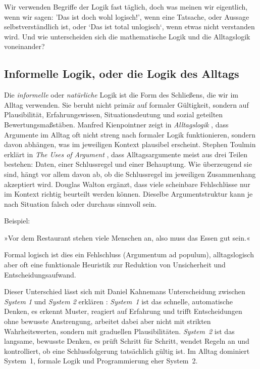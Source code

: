 \documentclass[parskip=half,a4paper,11pt]{scrreprt}
\begin{document}
Wir verwenden Begriffe der Logik fast täglich, doch was meinen wir eigentlich, wenn wir sagen:  ’Das ist doch wohl logisch!’, wenn eine Tatsache, oder Aussage selbstverständlich ist, oder ‘Das ist total unlogisch‘, wenn etwas nicht verstanden wird. Und wie unterscheiden sich die mathematische Logik und die Alltagslogik voneinander?

\subsection{Informelle Logik, oder die Logik des Alltags}

Die \textit{informelle} oder \textit{natürliche} Logik ist die Form des Schließens, die wir im Alltag verwenden. Sie beruht nicht primär auf formaler Gültigkeit, sondern auf Plausibilität, Erfahrungswissen, Situationsdeutung und sozial geteilten Bewertungsmaßstäben. Manfred Kienpointner zeigt in \textit{Alltagslogik} \citep{Kienpointner1992}, dass Argumente im Alltag oft nicht streng nach formaler Logik funktionieren, sondern davon abhängen, was im jeweiligen Kontext plausibel erscheint. Stephen Toulmin erklärt in \textit{The Uses of Argument} \citep{Toulmin1958}, dass Alltagsargumente meist aus drei Teilen bestehen: Daten, einer Schlussregel und einer Behauptung. Wie überzeugend sie sind, hängt vor allem davon ab, ob die Schlussregel im jeweiligen Zusammenhang akzeptiert wird. Douglas Walton \citep{Walton1998} ergänzt, dass viele scheinbare Fehlschlüsse nur im Kontext richtig beurteilt werden können. Dieselbe Argumentstruktur kann je nach Situation falsch oder durchaus sinnvoll sein. 

Beispiel: 
\begin{displayquote}
»Vor dem Restaurant stehen viele Menschen an, also muss das Essen gut sein.«
\end{displayquote}
Formal logisch ist dies ein Fehlschluss (Argumentum ad populum), alltagslogisch aber oft eine funktionale Heuristik zur Reduktion von Unsicherheit und Entscheidungsaufwand.

Dieser Unterschied lässt sich mit Daniel Kahnemans Unterscheidung zwischen \textit{System 1} und \textit{System 2} erklären \citep{Kahneman2011}: \textit{System~1} ist das schnelle, automatische Denken, es erkennt Muster, reagiert auf Erfahrung und trifft Entscheidungen ohne bewusste Anstrengung, arbeitet dabei aber nicht mit strikten Wahrheitswerten, sondern mit graduellen Plausibilitäten. \textit{System~2} ist das langsame, bewusste Denken, es prüft Schritt für Schritt, wendet Regeln an und kontrolliert, ob eine Schlussfolgerung tatsächlich gültig ist. Im Alltag dominiert System~1, formale Logik und Programmierung eher System~2. 
\end{document}
